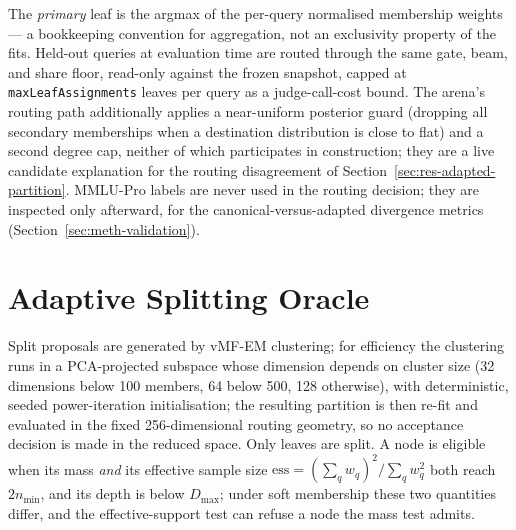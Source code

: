 The \textit{primary} leaf is the argmax of the per-query normalised membership weights
--- a bookkeeping convention for aggregation, not an exclusivity property of the fits.
Held-out queries at evaluation time are routed through the same gate, beam, and share
floor, read-only against the frozen snapshot, capped at \texttt{maxLeafAssignments}
leaves per query as a judge-call-cost bound.
The arena's routing path additionally applies a near-uniform posterior guard (dropping
all secondary memberships when a destination distribution is close to flat) and a second
degree cap, neither of which participates in construction; they are a live candidate
explanation for the routing disagreement of Section~\ref{sec:res-adapted-partition}.
MMLU-Pro labels are never used in the routing decision; they are inspected only
afterward, for the canonical-versus-adapted divergence metrics
(Section~\ref{sec:meth-validation}).

\section{Adaptive Splitting Oracle}\label{sec:meth-split}

Split proposals are generated by vMF-EM clustering; for efficiency the clustering runs in
a PCA-projected subspace whose dimension depends on cluster size (32 dimensions below 100
members, 64 below 500, 128 otherwise), with deterministic, seeded power-iteration
initialisation; the resulting partition is then re-fit and evaluated in the fixed
256-dimensional routing geometry, so no acceptance decision is made in the reduced space.
Only leaves are split. A node is eligible when its mass \emph{and} its effective sample
size $\mathrm{ess} = (\sum_q w_q)^2 / \sum_q w_q^2$ both reach $2 n_{\min}$, and its
depth is below $D_{\max}$; under soft membership these two quantities differ, and the
effective-support test can refuse a node the mass test admits.

